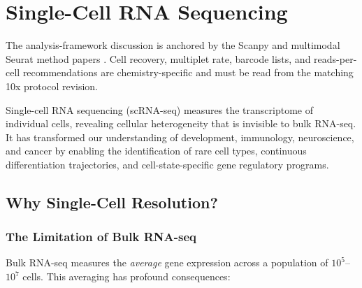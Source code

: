 \chapter{Single-Cell RNA Sequencing}
\label{ch:scrnaseq}

\begin{sourcebox}
The analysis-framework discussion is anchored by the Scanpy and multimodal Seurat method papers \cite{wolf2018,hao2021}. Cell recovery, multiplet rate, barcode lists, and reads-per-cell recommendations are chemistry-specific and must be read from the matching 10x protocol revision.
\end{sourcebox}

\begin{keyconcept}
Single-cell RNA sequencing (\acrshort{scRNA-seq}) measures the transcriptome
of individual cells, revealing cellular heterogeneity that is invisible to bulk
RNA-seq. It has transformed our understanding of development, immunology,
neuroscience, and cancer by enabling the identification of rare cell types,
continuous differentiation trajectories, and cell-state-specific gene
regulatory programs.
\end{keyconcept}

\section{Why Single-Cell Resolution?}
\label{sec:scrnaseq:why}

\subsection{The Limitation of Bulk RNA-seq}

Bulk RNA-seq measures the \emph{average} gene expression across a population
of $10^5$--$10^7$ cells. This averaging has profound consequences:

